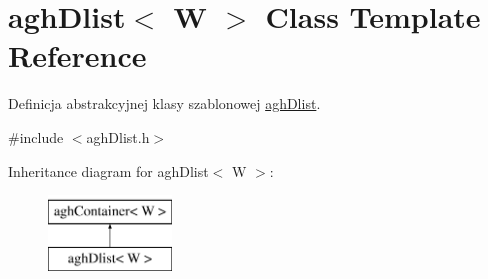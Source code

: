 \hypertarget{classaghDlist}{\section{agh\-Dlist$<$ \-W $>$ \-Class \-Template \-Reference}
\label{classaghDlist}
}


\-Definicja abstrakcyjnej klasy szablonowej \hyperlink{classaghDlist}{agh\-Dlist}.  




{\ttfamily \#include $<$agh\-Dlist.\-h$>$}

\-Inheritance diagram for agh\-Dlist$<$ \-W $>$\-:\begin{figure}[H]
\begin{center}
\leavevmode
\includegraphics[height=2.000000cm]{classaghDlist}
\end{center}
\end{figure}
